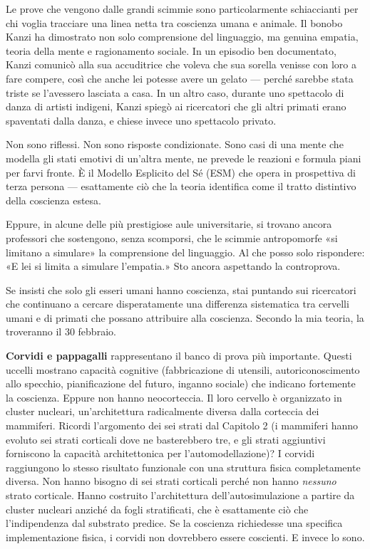 \documentclass[11pt, twoside, openright]{book}
\begin{document}
Le prove che vengono dalle grandi scimmie sono particolarmente schiaccianti per chi voglia tracciare una linea netta tra coscienza umana e animale. Il bonobo Kanzi ha dimostrato non solo comprensione del linguaggio, ma genuina empatia, teoria della mente e ragionamento sociale. In un episodio ben documentato, Kanzi comunicò alla sua accuditrice che voleva che sua sorella venisse con loro a fare compere, così che anche lei potesse avere un gelato --- perché sarebbe stata triste se l'avessero lasciata a casa. In un altro caso, durante uno spettacolo di danza di artisti indigeni, Kanzi spiegò ai ricercatori che gli altri primati erano spaventati dalla danza, e chiese invece uno spettacolo privato.

Non sono riflessi. Non sono risposte condizionate. Sono casi di una mente che modella gli stati emotivi di un'altra mente, ne prevede le reazioni e formula piani per farvi fronte. È il Modello Esplicito del Sé (ESM) che opera in prospettiva di terza persona --- esattamente ciò che la teoria identifica come il tratto distintivo della coscienza estesa.

Eppure, in alcune delle più prestigiose aule universitarie, si trovano ancora professori che sostengono, senza scomporsi, che le scimmie antropomorfe «si limitano a simulare» la comprensione del linguaggio. Al che posso solo rispondere: «E lei si limita a simulare l'empatia.» Sto ancora aspettando la controprova.

Se insisti che solo gli esseri umani hanno coscienza, stai puntando sui ricercatori che continuano a cercare disperatamente una differenza sistematica tra cervelli umani e di primati che possano attribuire alla coscienza. Secondo la mia teoria, la troveranno il 30 febbraio.

\textbf{Corvidi e pappagalli} rappresentano il banco di prova più importante. Questi uccelli mostrano capacità cognitive (fabbricazione di utensili, autoriconoscimento allo specchio, pianificazione del futuro, inganno sociale) che indicano fortemente la coscienza. Eppure non hanno neocorteccia. Il loro cervello è organizzato in cluster nucleari, un'architettura radicalmente diversa dalla corteccia dei mammiferi. Ricordi l'argomento dei sei strati dal Capitolo 2 (i mammiferi hanno evoluto sei strati corticali dove ne basterebbero tre, e gli strati aggiuntivi forniscono la capacità architettonica per l'automodellazione)? I corvidi raggiungono lo stesso risultato funzionale con una struttura fisica completamente diversa. Non hanno bisogno di sei strati corticali perché non hanno \textit{nessuno} strato corticale. Hanno costruito l'architettura dell'autosimulazione a partire da cluster nucleari anziché da fogli stratificati, che è esattamente ciò che l'indipendenza dal substrato predice. Se la coscienza richiedesse una specifica implementazione fisica, i corvidi non dovrebbero essere coscienti. E invece lo sono.
\end{document}
